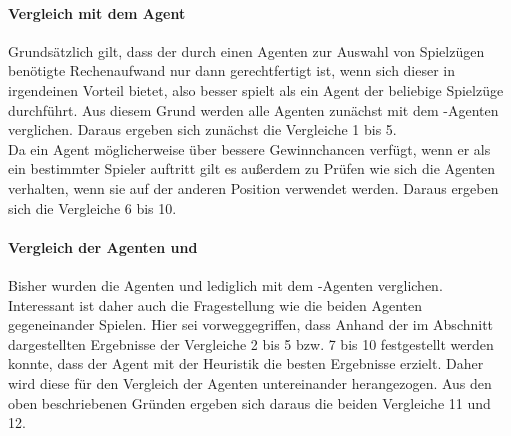 \paragraph{Vergleich mit dem Agent }
Grundsätzlich gilt, dass der durch einen Agenten zur Auswahl von Spielzügen benötigte Rechenaufwand nur dann gerechtfertigt ist, wenn sich dieser in irgendeinen Vorteil bietet, also besser spielt als ein Agent der beliebige Spielzüge durchführt. Aus diesem Grund werden alle Agenten zunächst mit dem -Agenten verglichen. Daraus ergeben sich zunächst die Vergleiche 1 bis 5.
\\Da ein Agent möglicherweise über bessere Gewinnchancen verfügt, wenn er als ein bestimmter Spieler auftritt gilt es außerdem zu Prüfen wie sich die Agenten verhalten, wenn sie auf der anderen Position verwendet werden. Daraus ergeben sich die Vergleiche 6 bis 10. 

\paragraph{Vergleich der Agenten  und }
Bisher wurden die Agenten  und  lediglich mit dem -Agenten verglichen. Interessant ist daher auch die Fragestellung wie die beiden Agenten gegeneinander Spielen. Hier sei vorweggegriffen, dass Anhand der im Abschnitt  dargestellten Ergebnisse der Vergleiche 2 bis 5 bzw. 7 bis 10 festgestellt werden konnte, dass der Agent  mit der Heuristik   die besten Ergebnisse erzielt. Daher wird diese für den Vergleich der Agenten untereinander herangezogen. Aus den oben beschriebenen Gründen ergeben sich daraus die beiden Vergleiche 11 und 12.

